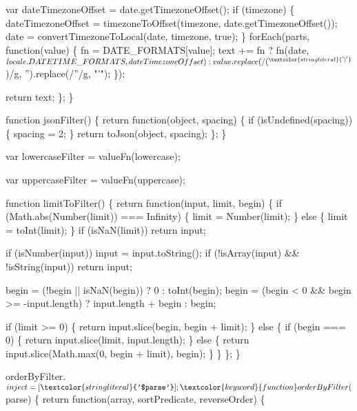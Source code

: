 \begin{DoxyCodeInclude}
{{{{    var dateTimezoneOffset = date.getTimezoneOffset();
    \textcolor{keywordflow}{if} (timezone) \{
      dateTimezoneOffset = timezoneToOffset(timezone, date.getTimezoneOffset());
      date = convertTimezoneToLocal(date, timezone, \textcolor{keyword}{true});
    \}
    forEach(parts, \textcolor{keyword}{function}(value) \{
      fn = DATE\_FORMATS[value];
      text += fn ? fn(date, $locale.DATETIME\_FORMATS, dateTimezoneOffset)
                 : value.replace(/(^\textcolor{stringliteral}{'|'}$)/g, \textcolor{stringliteral}{''}).replace(/\textcolor{stringliteral}{''}/g, \textcolor{stringliteral}{"'"});
    \});

    \textcolor{keywordflow}{return} text;
  \};
\}


\textcolor{keyword}{function} jsonFilter() \{
  \textcolor{keywordflow}{return} \textcolor{keyword}{function}(object, spacing) \{
    \textcolor{keywordflow}{if} (isUndefined(spacing)) \{
        spacing = 2;
    \}
    \textcolor{keywordflow}{return} toJson(\textcolor{keywordtype}{object}, spacing);
  \};
\}


var lowercaseFilter = valueFn(lowercase);


var uppercaseFilter = valueFn(uppercase);

\textcolor{keyword}{function} limitToFilter() \{
  \textcolor{keywordflow}{return} \textcolor{keyword}{function}(input, limit, begin) \{
    \textcolor{keywordflow}{if} (Math.abs(Number(limit)) === Infinity) \{
      limit = Number(limit);
    \} \textcolor{keywordflow}{else} \{
      limit = toInt(limit);
    \}
    \textcolor{keywordflow}{if} (isNaN(limit)) \textcolor{keywordflow}{return} input;

    \textcolor{keywordflow}{if} (isNumber(input)) input = input.toString();
    \textcolor{keywordflow}{if} (!isArray(input) && !isString(input)) \textcolor{keywordflow}{return} input;

    begin = (!begin || isNaN(begin)) ? 0 : toInt(begin);
    begin = (begin < 0 && begin >= -input.length) ? input.length + begin : begin;

    if (limit >= 0) \{
      \textcolor{keywordflow}{return} input.slice(begin, begin + limit);
    \} \textcolor{keywordflow}{else} \{
      \textcolor{keywordflow}{if} (begin === 0) \{
        \textcolor{keywordflow}{return} input.slice(limit, input.length);
      \} \textcolor{keywordflow}{else} \{
        \textcolor{keywordflow}{return} input.slice(Math.max(0, begin + limit), begin);
      \}
    \}
  \};
\}

orderByFilter.$inject = [\textcolor{stringliteral}{'$parse'}];
\textcolor{keyword}{function} orderByFilter($parse) \{
  \textcolor{keywordflow}{return} \textcolor{keyword}{function}(array, sortPredicate, reverseOrder) \{

}}}}
\end{DoxyCodeInclude}
